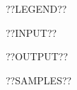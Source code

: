 \renewcommand\problemletter{??LETTER??}
\renewcommand\problemtitle{??NAME??}
\renewcommand\timelimit{??TIMELIMIT??}
\renewcommand\memorylimit{??MEMORYLIMIT??}

\problemheader
??LEGEND??

??INPUT??

\outputsection
??OUTPUT??

\samplessection
??SAMPLES??
